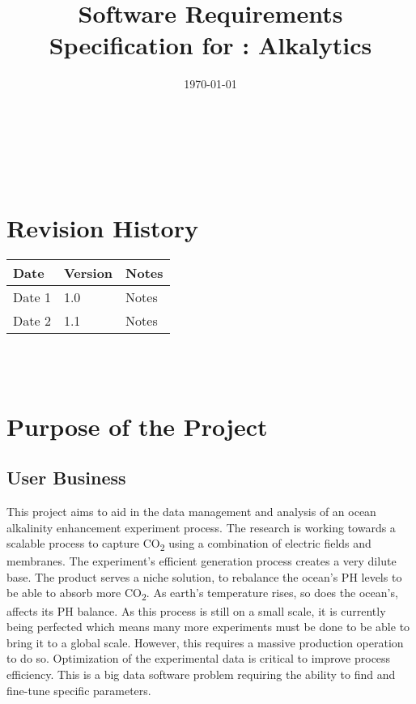 \documentclass[12pt]{article}
\begin{document}
\title{Software Requirements Specification for \progname: Alkalytics} 
\author{\authname}
\date{\today}
	
\maketitle

~\newpage


\tableofcontents

~\newpage

\section*{Revision History}

\begin{tabularx}{\textwidth}{p{3cm}p{2cm}X} \toprule {\textbf{Date}} &
{\textbf{Version}} & {\textbf{Notes}}\\
\midrule
Date 1 & 1.0 & Notes\\
Date 2 & 1.1 & Notes\\
\bottomrule
\end{tabularx}

~\\

~\newpage
\section{Purpose of the Project}
\subsection{User Business}
This project aims to aid in the data management and analysis of an ocean
alkalinity enhancement experiment process. The research is working towards a
scalable process to capture CO\textsubscript{2} using a combination of electric
fields and membranes. The experiment's efficient generation process creates a
very dilute base. The product serves a niche solution, to rebalance the ocean's
PH levels to be able to absorb more CO\textsubscript{2}. As earth’s temperature
rises, so does the ocean’s, affects its PH balance. As this process is still on
a small scale, it is currently being perfected which means many more experiments
must be done to be able to bring it to a global scale. However, this requires a
massive production operation to do so. Optimization of the experimental data is
critical to improve process efficiency. This is a big data software problem
requiring the ability to find and fine-tune specific parameters. 
\end{document}
